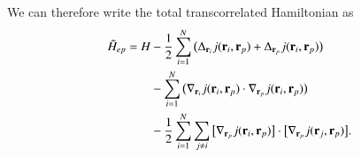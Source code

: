 \documentclass[aip,jcp,reprint,noshowkeys,superscriptaddress]{revtex4-1}
\newcommand{\bri}[1]{{\bf r}_{#1}}
\newcommand{\Hept}[0]{\tilde{H}_{ep}}
\begin{document}
We can therefore write the total transcorrelated Hamiltonian as 
\begin{equation}
 \begin{aligned}
 \Hept  = H& -\frac{1}{2} \sum_{i=1}^N \big(\Delta_{\bri{i}} j(\bri{i},\bri{p}) + \Delta_{\bri{p}} j(\bri{i},\bri{p}) \big) \\
           & -\sum_{i=1}^N \big(\nabla_{\bri{i}} j(\bri{i},\bri{p}) \cdot \nabla_{\bri{p}} j(\bri{i},\bri{p}) \big) \\
           & -\frac{1}{2} \sum_{i=1}^N \sum_{j\ne i} \big[ \nabla_{\bri{p}} j(\bri{i},\bri{p})\big] \cdot \big[ \nabla_{\bri{p}} j(\bri{j},\bri{p})\big].
 \end{aligned}
\end{equation}



\end{document}
